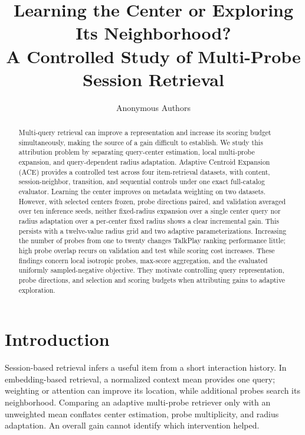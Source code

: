 \documentclass[runningheads]{llncs}
\newcommand{\method}{\textsc{ACE}}
\begin{document}
\title{Learning the Center or Exploring Its Neighborhood?\\
A Controlled Study of Multi-Probe Session Retrieval}

\author{Anonymous Authors}

\maketitle

\begin{abstract}
Multi-query retrieval can improve a representation and increase its scoring
budget simultaneously, making the source of a gain difficult to establish.
We study this attribution problem by separating query-center estimation,
local multi-probe expansion, and query-dependent radius adaptation.
Adaptive Centroid Expansion (\method) provides a controlled test across four
item-retrieval datasets, with content, session-neighbor, transition, and
sequential controls under one exact full-catalog evaluator.
Learning the center improves on metadata weighting on two datasets. However,
with selected centers frozen, probe directions paired, and validation averaged
over ten inference seeds, neither fixed-radius expansion over a single center
query nor radius adaptation over a per-center fixed radius shows a clear
incremental gain. This persists with a twelve-value radius grid and two
adaptive parameterizations. Increasing the number of probes from one to twenty
changes TalkPlay ranking performance little; high probe overlap recurs on
validation and test while scoring cost increases.
These findings concern local isotropic probes, max-score aggregation, and the
evaluated uniformly sampled-negative objective. They motivate controlling query
representation, probe directions, and selection and scoring budgets when
attributing gains to adaptive exploration.
\end{abstract}

\section{Introduction}
\label{sec:introduction}

Session-based retrieval infers a useful item from a short interaction history.
In embedding-based retrieval, a normalized context mean provides one query;
weighting or attention can improve its location, while additional probes search
its neighborhood. Comparing an adaptive multi-probe retriever only with an
unweighted mean conflates center estimation, probe multiplicity, and radius
adaptation. An overall gain cannot identify which intervention helped.
\end{document}
